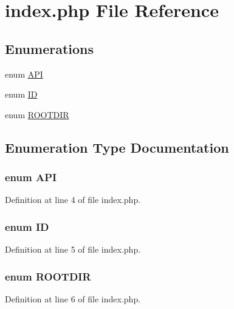\hypertarget{index_8php}{
\section{index.php File Reference}
\label{de/d20/index_8php}
}
\subsection*{Enumerations}
\begin{DoxyCompactItemize}
\item 
enum \hyperlink{index_8php_ab2d7ab3465c4ea6c2054e6307dde8255}{API} 
\item 
enum \hyperlink{index_8php_a094c367727273b4da2b960ca3b3edc06}{ID} 
\item 
enum \hyperlink{index_8php_a97c0f936c01d480557c8694b263f3d5e}{ROOTDIR} 
\end{DoxyCompactItemize}


\subsection{Enumeration Type Documentation}
\hypertarget{index_8php_ab2d7ab3465c4ea6c2054e6307dde8255}{
\subsubsection[{API}]{\setlength{\rightskip}{0pt plus 5cm}enum {\bf API}}}
\label{de/d20/index_8php_ab2d7ab3465c4ea6c2054e6307dde8255}


Definition at line 4 of file index.php.\hypertarget{index_8php_a094c367727273b4da2b960ca3b3edc06}{
\subsubsection[{ID}]{\setlength{\rightskip}{0pt plus 5cm}enum {\bf ID}}}
\label{de/d20/index_8php_a094c367727273b4da2b960ca3b3edc06}


Definition at line 5 of file index.php.\hypertarget{index_8php_a97c0f936c01d480557c8694b263f3d5e}{
\subsubsection[{ROOTDIR}]{\setlength{\rightskip}{0pt plus 5cm}enum {\bf ROOTDIR}}}
\label{de/d20/index_8php_a97c0f936c01d480557c8694b263f3d5e}


Definition at line 6 of file index.php.